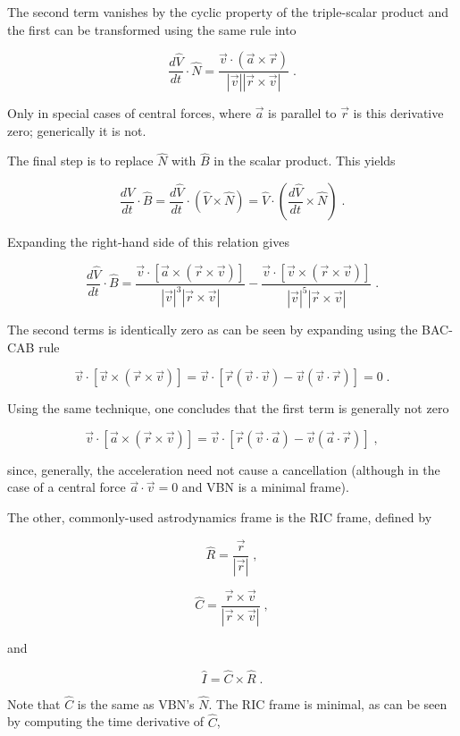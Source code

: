 \documentclass[10pt]{article}
\begin{document}
The second term vanishes by the cyclic property of the triple-scalar product and the first can be transformed using the same rule into

\[ \frac{d \hat V}{dt} \cdot \hat N = \frac{\vec v \cdot (\vec a \times \vec r) }{|\vec v||\vec r \times \vec v|} \; . \]

Only in special cases of central forces, where $\vec a$ is parallel to $\vec r$ is this derivative zero; generically it is not.

The final step is to replace $\hat N$ with $\hat B$ in the scalar product.  This yields

\[ \frac{d \hat V}{dt} \cdot \hat B = \frac{d \hat V}{dt} \cdot (\hat V \times \hat N) = \hat V \cdot \left(\frac{d \hat V}{dt} \times \hat N \right) \; .\]

Expanding the right-hand side of this relation gives

\[ \frac{d \hat V}{dt} \cdot \hat B = \frac{ \vec  v \cdot [\vec a \times (\vec r \times \vec v)] }{ |\vec v|^3 |\vec r \times \vec v |} - \frac{ \vec v \cdot [\vec v \times (\vec r \times \vec v)]}{|\vec v|^5 |\vec r \times \vec v|} \; .\]

The second terms is identically zero as can be seen by expanding using the BAC-CAB rule

\[ \vec v \cdot [\vec v \times (\vec r \times \vec v)] = \vec v \cdot \left[ \vec r (\vec v \cdot \vec v) - \vec v (\vec v \cdot \vec r) \right ] = 0 \; .\]

Using the same technique, one concludes that the first term is generally not zero

\[ \vec v \cdot [\vec a \times (\vec r \times \vec v)] = \vec v \cdot \left[ \vec r (\vec v \cdot \vec a) - \vec v (\vec a \cdot \vec r) \right ] \; ,\]

since, generally, the acceleration need not cause a cancellation (although in the case of a central force $\vec a \cdot \vec v = 0$ and VBN is a minimal frame).

The other, commonly-used astrodynamics frame is the RIC frame, defined by 

\[ \hat R = \frac{\vec r}{|\vec r|} \; ,\]

\[ \hat C =  \frac{ \vec r \times \vec v }{ | \vec r \times \vec v | } \; ,\]

and 

\[ \hat I = \hat C \times \hat R \; .\]

Note that $\hat C$ is the same as VBN's $\hat N$.  The RIC frame is minimal, as can be seen by computing the time derivative of $\hat C$, 
\end{document}
